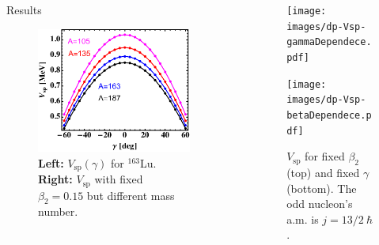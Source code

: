\documentclass[final]{beamer}
\newlength{\sepwidth}
\newlength{\colwidth}
\newcommand{\separatorcolumn}{\begin{column}{\sepwidth}\end{column}}
\begin{document}
\begin{frame}[t]
\begin{columns}[t]
\begin{column}{\colwidth}
\begin{block}{Results}
\begin{figure}
\begin{minipage}{.5\textwidth}
  \centering
 \includegraphics[scale=1]{images/VSp_gammaBehavior-A.pdf}
\end{minipage}
     \caption{\textbf{Left:} $V_\text{sp}(\gamma)$ for $^{163}$Lu. \textbf{Right:} $V_\text{sp}$ with fixed $\beta_2=0.15$ but different mass number.}
     \label{vsp-behavior-gamma}
 \end{figure}
  \end{block}
  
  
\end{column}

\separatorcolumn

\begin{column}{\colwidth}
 \begin{figure}
     \centering
     \texttt{[image: images/dp-Vsp-gammaDependece.pdf]}
     
     \texttt{[image: images/dp-Vsp-betaDependece.pdf]}
     \caption{$V_\text{sp}$ for fixed $\beta_2$ (top) and fixed $\gamma$ (bottom). The odd nucleon's a.m. is $j=13/2\ \hbar$.}
     \label{gamma-beta-dev-v}
 \end{figure}
  

\end{column}
\end{columns}
\end{frame}
\end{document}
